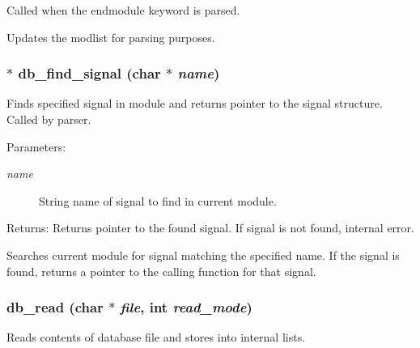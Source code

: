 Called when the endmodule keyword is parsed. 

Updates the modlist for parsing purposes. 
\subsubsection{$\ast$ db\_\-find\_\-signal (char $\ast$ {\em name})}\label{db_8h_a10}


Finds specified signal in module and returns pointer to the signal structure. Called by parser. 

\begin{Desc}
\item[Parameters:]
\begin{description}
\item[{\em name}]String name of signal to find in current module.\end{description}
\end{Desc}
\begin{Desc}
\item[Returns:]Returns pointer to the found signal. If signal is not found, internal error.\end{Desc}
Searches current module for signal matching the specified name. If the signal is found, returns a pointer to the calling function for that signal. 
\subsubsection{ db\_\-read (char $\ast$ {\em file}, int {\em read\_\-mode})}\label{db_8h_a1}


Reads contents of database file and stores into internal lists. 

